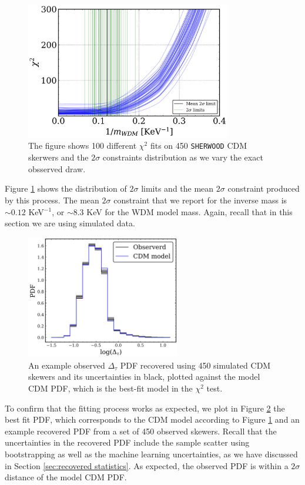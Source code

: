 \begin{figure}
    \centering
    \includegraphics[width=0.8\textwidth]{img/ML/inference_cdm_sherwood.png}
    \caption{The figure shows 100 different $\chi^2$ fits on 450 \texttt{SHERWOOD} CDM skerwers and the $2\sigma$ constraints distribution as we vary the exact obsserved draw.}
    \label{fig: inference cdm sherwood}
\end{figure}
Figure \ref{fig: inference cdm sherwood} shows the distribution of $2\sigma$ limits and the mean $2\sigma$ constraint produced by this process. The mean $2\sigma$ constraint that we report for the inverse mass is $\sim 0.12$ KeV$^{-1}$, or $\sim 8.3$ KeV for the WDM model mass. Again, recall that in this section we are using simulated data.

\begin{figure}
    \centering
    \includegraphics[width=0.6\textwidth]{img/ML/pdf_model_observed.png}
    \caption{An example observed $\Delta_\tau$ PDF recovered using 450 simulated CDM skewers and its uncertainties in black, plotted against the model CDM PDF, which is the best-fit model in the $\chi^2$ test. }
    \label{fig: inference cdm PDF}
\end{figure}

To confirm that the fitting process works as expected, we plot in Figure \ref{fig: inference cdm PDF} the best fit PDF, which corresponds to the CDM model according to Figure \ref{fig: inference cdm sherwood} and an example recovered PDF from a set of 450 observed skewers. Recall that the uncertainties in the recovered PDF include the sample scatter using bootstrapping as well as the machine learning uncertainties, as we have discussed in Section \ref{sec:recovered statistics}. As expected, the observed PDF is within a $2\sigma$ distance of the model CDM PDF.

